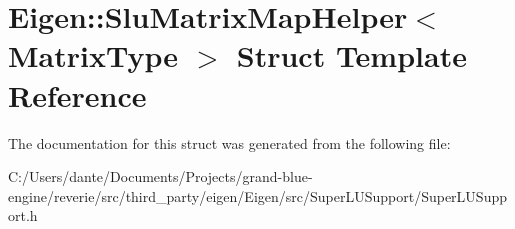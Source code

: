 \hypertarget{struct_eigen_1_1_slu_matrix_map_helper}{}\section{Eigen\+::Slu\+Matrix\+Map\+Helper$<$ Matrix\+Type $>$ Struct Template Reference}
\label{struct_eigen_1_1_slu_matrix_map_helper}


The documentation for this struct was generated from the following file\+:\begin{DoxyCompactItemize}
\item 
C\+:/\+Users/dante/\+Documents/\+Projects/grand-\/blue-\/engine/reverie/src/third\+\_\+party/eigen/\+Eigen/src/\+Super\+L\+U\+Support/Super\+L\+U\+Support.\+h\end{DoxyCompactItemize}
